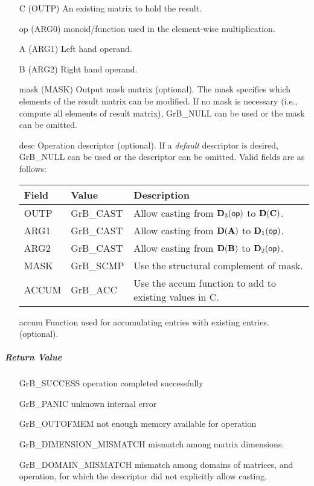 \begin{itemize}[leftmargin=1.1in]
	\item[{\sf C}]     ({\sf OUTP}) An existing matrix to hold the result.
	\item[{\sf op}]    ({\sf ARG0}) monoid/function used in the element-wise multiplication.
	\item[{\sf A}]     ({\sf ARG1}) Left hand operand.
	\item[{\sf B}]     ({\sf ARG2}) Right hand operand.
	
	\item[{\sf mask}] ({\sf MASK}) Output mask matrix (optional). The mask
	specifies which elements of the result matrix can be modified.
	If no mask is necessary (i.e., compute all elements of result
	matrix), {\sf GrB\_NULL} can be used or the mask can be omitted.
	
	\item[{\sf desc}]  Operation descriptor (optional). If a
	\emph{default} descriptor is desired, {\sf GrB\_NULL} can be
	used or the descriptor can be omitted. Valid fields are as follows: \\
	\begin{tabular}{lll}
		Field  & Value & Description \\
		\hline
		{\sf OUTP} & {\sf GrB\_CAST} & Allow casting from $\bold{D}_3({\sf op})$ to $\bold{D}({\bf C})$. \\
		{\sf ARG1} & {\sf GrB\_CAST} & Allow casting from $\bold{D}({\bf A})$ to $\bold{D}_1({\sf op})$. \\
		{\sf ARG2} & {\sf GrB\_CAST} & Allow casting from $\bold{D}({\bf B})$ to $\bold{D}_2({\sf op})$. \\
		{\sf MASK} & {\sf GrB\_SCMP} & Use the structural complement of {\sf mask}. \\
		{\sf ACCUM}& {\sf GrB\_ACC}  & Use the {\sf accum} function to add to existing values in {\sf C}.\\
	\end{tabular}
	
	\item[{\sf accum}]  Function used for accumulating entries with existing  entries. (optional).
\end{itemize}

\subparagraph{Return Value}

\begin{itemize}[leftmargin=2.1in]
	\item[{\sf GrB\_SUCCESS}]             operation completed successfully
	\item[{\sf GrB\_PANIC}]               unknown internal error
	\item[{\sf GrB\_OUTOFMEM}]            not enough memory available for operation
	\item[{\sf GrB\_DIMENSION\_MISMATCH}] mismatch among matrix dimensions.
	\item[{\sf GrB\_DOMAIN\_MISMATCH}]    mismatch among domains of matrices, and operation, for which the descriptor did not explicitly allow casting.
\end{itemize}

